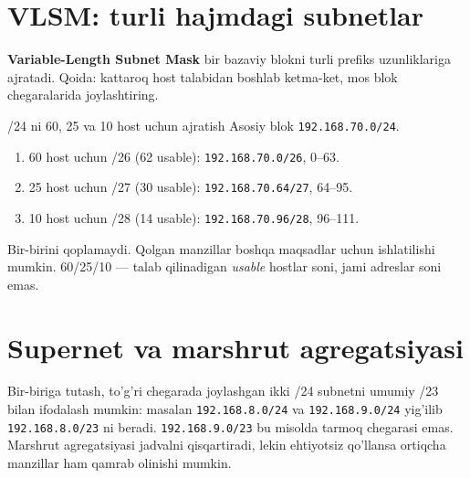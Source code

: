 \documentclass[11pt,a4paper,oneside]{book}
\newcommand{\kw}[1]{\textbf{\color{Deep}#1}}
\newcommand{\ip}[1]{\texttt{#1}}
\begin{document}
\section{VLSM: turli hajmdagi subnetlar}
\kw{Variable-Length Subnet Mask} bir bazaviy blokni turli prefiks uzunliklariga ajratadi. Qoida: kattaroq host talabidan boshlab ketma-ket, mos blok chegaralarida joylashtiring.
\begin{worked}{/24 ni 60, 25 va 10 host uchun ajratish}
Asosiy blok \ip{192.168.70.0/24}.
\begin{enumerate}
\item 60 host uchun /26 (62 usable): \ip{192.168.70.0/26}, 0--63.
\item 25 host uchun /27 (30 usable): \ip{192.168.70.64/27}, 64--95.
\item 10 host uchun /28 (14 usable): \ip{192.168.70.96/28}, 96--111.
\end{enumerate}
Bir-birini qoplamaydi. Qolgan manzillar boshqa maqsadlar uchun ishlatilishi mumkin. 60/25/10 — talab qilinadigan \emph{usable} hostlar soni, jami adreslar soni emas.
\end{worked}
\section{Supernet va marshrut agregatsiyasi}
Bir-biriga tutash, to'g'ri chegarada joylashgan ikki /24 subnetni umumiy /23 bilan ifodalash mumkin: masalan \ip{192.168.8.0/24} va \ip{192.168.9.0/24} yig'ilib \ip{192.168.8.0/23} ni beradi. \ip{192.168.9.0/23} bu misolda tarmoq chegarasi emas. Marshrut agregatsiyasi jadvalni qisqartiradi, lekin ehtiyotsiz qo'llansa ortiqcha manzillar ham qamrab olinishi mumkin.
\end{document}
